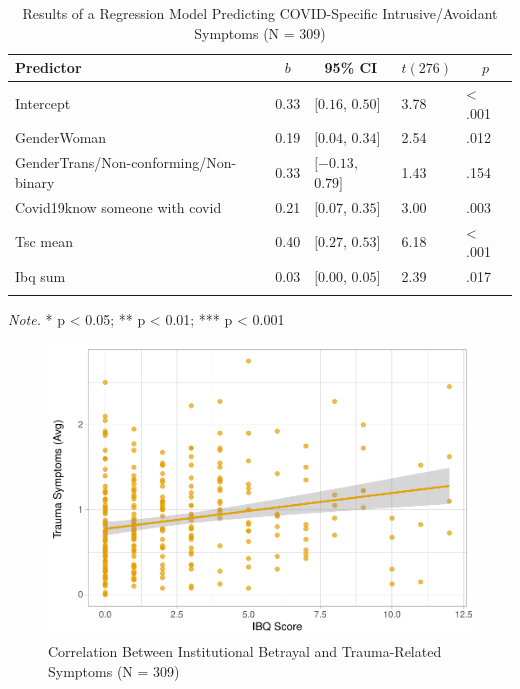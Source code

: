 \documentclass[
  english,
  man, noextraspace]{apa6}
\begin{document}
\begin{table}[tbp]

\begin{center}
\begin{threeparttable}

\caption{\label{tab:table2}Results of a Regression Model Predicting COVID-Specific Intrusive/Avoidant Symptoms (N = 309)}

\begin{tabular}{lllll}
\toprule
Predictor & \multicolumn{1}{c}{$b$} & \multicolumn{1}{c}{95\% CI} & \multicolumn{1}{c}{$t(276)$} & \multicolumn{1}{c}{$p$}\\
\midrule
Intercept & 0.33 & $[0.16$, $0.50]$ & 3.78 & < .001\\
GenderWoman & 0.19 & $[0.04$, $0.34]$ & 2.54 & .012\\
GenderTrans/Non-conforming/Non-binary & 0.33 & $[-0.13$, $0.79]$ & 1.43 & .154\\
Covid19know someone with covid & 0.21 & $[0.07$, $0.35]$ & 3.00 & .003\\
Tsc mean & 0.40 & $[0.27$, $0.53]$ & 6.18 & < .001\\
Ibq sum & 0.03 & $[0.00$, $0.05]$ & 2.39 & .017\\
\bottomrule
\addlinespace
\end{tabular}

\begin{tablenotes}[para]
\normalsize{\textit{Note.} * p < 0.05; ** p < 0.01; *** p < 0.001}
\end{tablenotes}

\end{threeparttable}
\end{center}

\end{table}

\begin{figure}[H]

{\centering \includegraphics[width=\textwidth]{papaja_doc_files/figure-latex/figure3-1} 

}

\caption{Correlation Between Institutional Betrayal and Trauma-Related Symptoms (N = 309) 
}\label{fig:figure3}
\end{figure}
\end{document}
